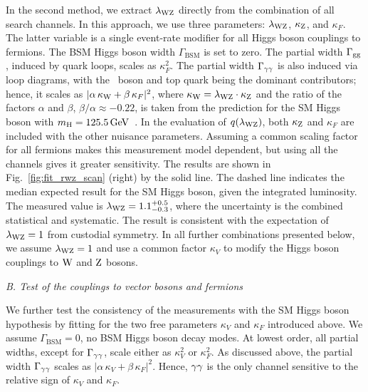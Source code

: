 \documentclass[11pt,twoside,a4paper,cmspaper,final,collab]{cms-tdr}
\begin{document}
In the second method, we extract $\lambda_{\mathrm{W}\mathrm{Z}}$ directly from the combination of all search
channels.  In this approach, we use  three parameters: $\lambda_{\mathrm{W}\mathrm{Z}}$,
$\kappa_{\mathrm{Z}}$, and $\kappa_F$. The latter variable is a single event-rate modifier for
all Higgs boson couplings to fermions. The BSM Higgs boson width $\Gamma_{\mathrm{BSM}}$ is set to zero.
The partial width $\Gamma_{\mathrm{g}\mathrm{g}}$, induced by quark loops, scales as $\kappa_F^2$.
The partial width $\Gamma_{\gamma\gamma}$ is also induced via
loop diagrams, with the \PW\ boson and top quark being the dominant contributors;
hence, it scales as $| \alpha \, \kappa_{\mathrm{W}} + \beta \, \kappa_F |^2$,
where $\kappa_{\mathrm{W}} = \lambda_{\mathrm{W}\mathrm{Z}} \cdot \kappa_{\mathrm{Z}}$ and
the ratio of the factors $\alpha$ and $\beta$,  $\beta / \alpha \approx -0.22$, is taken from the prediction
for the SM Higgs boson with $m_{\mathrm{H}}=125.5\,\text{Ge\hspace{-.08em}V}$~\cite{Spira:1995rr}.
In the evaluation of $q (\lambda_{\mathrm{W}\mathrm{Z}})$,
both $\kappa_{\mathrm{Z}}$ and $\kappa_F$ are included with the other nuisance
parameters. Assuming a common scaling factor for all fermions makes this measurement
model dependent, but using all the channels gives it
greater
sensitivity.
The results are shown in Fig.~\ref{fig:fit_rwz_scan} (right)
by the solid line. The dashed line indicates the median expected result for the SM Higgs boson,
given the integrated luminosity.
The measured value is $\lambda_{\mathrm{W}\mathrm{Z}} = 1.1^{+0.5}_{-0.3}$, where the uncertainty is
the combined statistical and systematic. The result is
consistent with the expectation of $\lambda_{\mathrm{W}\mathrm{Z}} =1$ from
custodial symmetry.  In all further combinations
presented below, we assume $\lambda_{\mathrm{W}\mathrm{Z}}=1$ and use a common factor $\kappa_V$
to modify the Higgs boson couplings to $\mathrm{W}$ and $\mathrm{Z}$ bosons.







\textit{B. Test of the couplings to vector bosons and fermions}

We further test the consistency of the measurements with the SM
Higgs boson hypothesis by fitting for the two free parameters $\kappa_V$ and $\kappa_F$ introduced above.
We assume  $\Gamma_{\mathrm{BSM}}=0$, \ie no BSM Higgs boson decay modes.
At lowest order, all partial widths,
except for $\Gamma_{\gamma\gamma}$, scale either as
$\kappa^2_V$ or $\kappa^2_F$.
As discussed above, the partial width $\Gamma_{\gamma\gamma}$
scales as $| \alpha \, \kappa_V + \beta \, \kappa_F |^2$.
Hence, $\gamma\gamma$ is the only channel sensitive to the relative sign of
$\kappa_V$ and $\kappa_F$.
\end{document}
